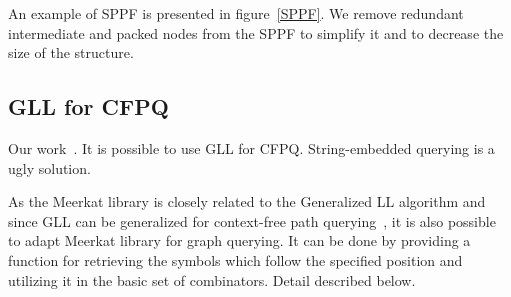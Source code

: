 An example of SPPF is presented in figure~\ref{SPPF}. We remove redundant intermediate and packed nodes from the SPPF to simplify it and to decrease the size of the structure.



\subsection{GLL for CFPQ}

Our work~\cite{GrigorevR16}. 
It is possible to use GLL for CFPQ.
String-embedded querying is a ugly solution. 

As the Meerkat library is closely related to the Generalized LL algorithm and since GLL can be generalized for context-free path querying~\cite{GrigorevR16}, it is also possible to adapt Meerkat library for graph querying. 
It can be done by providing a function for retrieving the symbols which follow the specified position and utilizing it in the basic set of combinators.
Detail described below.
